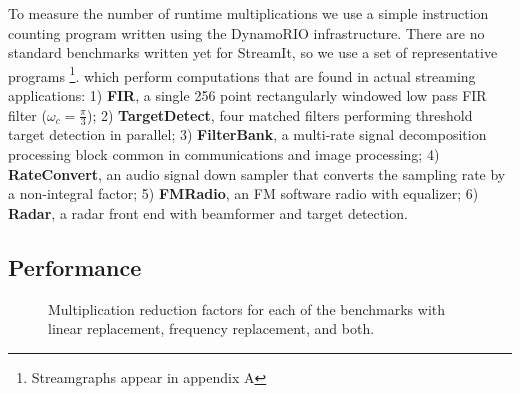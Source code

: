 To measure the number of runtime multiplications we use a simple instruction counting 
program written using the DynamoRIO\cite{dynamo99} infrastructure. 
There are no standard benchmarks written yet for StreamIt, so we use
a set of representative programs
\footnote{Streamgraphs appear in appendix A}.
which perform computations that 
are found in actual streaming applications: 1) {\bf FIR}, a single 256
point rectangularly windowed low pass FIR filter
($\omega_c=\frac{\pi}{3}$); 2) {\bf TargetDetect}, four matched
filters performing threshold target detection in parallel; 3) {\bf
FilterBank}, a multi-rate signal decomposition processing block common
in communications and image processing; 4) {\bf RateConvert}, an audio
signal down sampler that converts the sampling rate by a non-integral
factor; 5) {\bf FMRadio}, an FM software radio with equalizer; 6) {\bf
Radar}, a radar front end with beamformer and target detection.

\subsection{Performance}



\begin{figure}
\center
\epsfxsize=3.2in
\vspace{-6pt}
\caption{Multiplication reduction factors for each of the benchmarks with linear replacement, frequency replacement, and both.}
\label{fig:linear-freq-both}
\vspace{-12pt}
\end{figure}

